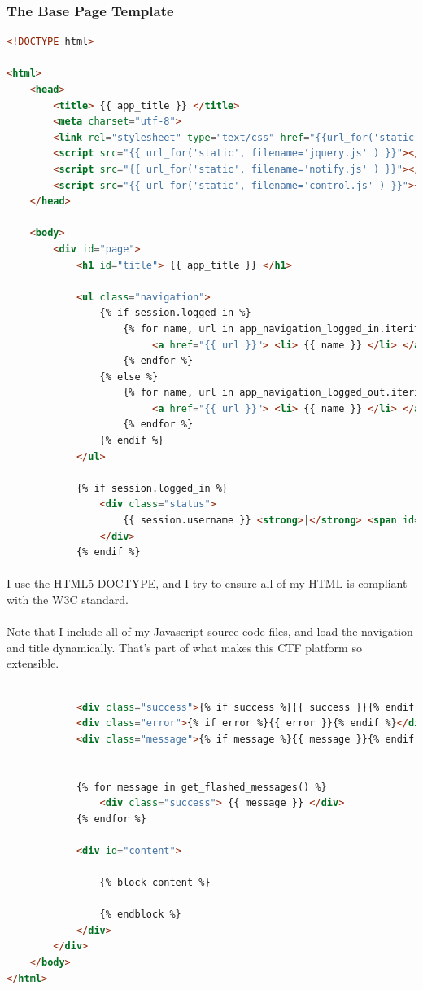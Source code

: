 \documentclass[11pt]{article}
\begin{document}
	\newpage

	\subsubsection{The Base Page Template}

	\begin{lstlisting}[language=HTML]
<!DOCTYPE html>

<html>
	<head>
		<title> {{ app_title }} </title>
		<meta charset="utf-8">
		<link rel="stylesheet" type="text/css" href="{{url_for('static', filename='stylesheet.css')}}">
		<script src="{{ url_for('static', filename='jquery.js' ) }}"></script>
		<script src="{{ url_for('static', filename='notify.js' ) }}"></script>
		<script src="{{ url_for('static', filename='control.js' ) }}"></script>
	</head>

	<body>
		<div id="page">
			<h1 id="title"> {{ app_title }} </h1>
			
			<ul class="navigation">
				{% if session.logged_in %}
					{% for name, url in app_navigation_logged_in.iteritems() %}
						 <a href="{{ url }}"> <li> {{ name }} </li> </a> 
					{% endfor %}
				{% else %}
					{% for name, url in app_navigation_logged_out.iteritems() %}
						 <a href="{{ url }}"> <li> {{ name }} </li> </a> 
					{% endfor %}
				{% endif %}
			</ul>

			{% if session.logged_in %}
				<div class="status">
					{{ session.username }} <strong>|</strong> <span id="score">{{ session.score }} pts </span>
				</div>
			{% endif %}
\end{lstlisting}

	\paragraph{} I use the HTML5 DOCTYPE, and I try to ensure all of my HTML is compliant with the W3C standard.

	\paragraph{} Note that I include all of my Javascript source code files, and load the navigation and title dynamically. That's part of what makes this CTF platform so extensible.

	\newpage

\begin{lstlisting}[language=HTML]

			<div class="success">{% if success %}{{ success }}{% endif %}</div>
			<div class="error">{% if error %}{{ error }}{% endif %}</div> 
			<div class="message">{% if message %}{{ message }}{% endif %}</div> 


			{% for message in get_flashed_messages() %}
				<div class="success"> {{ message }} </div>
			{% endfor %}

			<div id="content">
				
				{% block content %}
				
				{% endblock %}
			</div>
		</div>
	</body>
</html>
\end{lstlisting}
\end{document}
